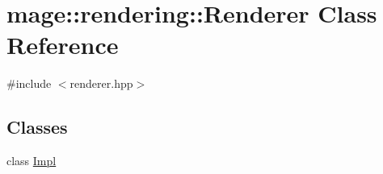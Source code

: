 \hypertarget{classmage_1_1rendering_1_1_renderer}{}\section{mage\+:\+:rendering\+:\+:Renderer Class Reference}
\label{classmage_1_1rendering_1_1_renderer}


{\ttfamily \#include $<$renderer.\+hpp$>$}

\subsection*{Classes}
\begin{DoxyCompactItemize}
\item 
class \mbox{\hyperlink{classmage_1_1rendering_1_1_renderer_1_1_impl}{Impl}}
\end{DoxyCompactItemize}
